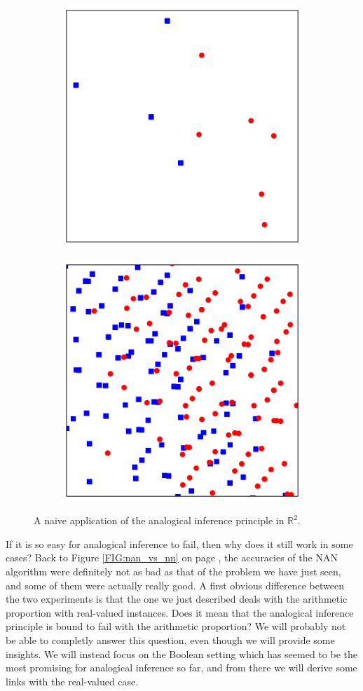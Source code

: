 \begin{figure}
\centering
\begin{subfigure}{.5\textwidth}
  \centering
  \includegraphics[width=.6\linewidth]{figures/AE_in_R2_S.pdf}
  \label{fig:sub1}
\end{subfigure}%
\begin{subfigure}{.5\textwidth}
  \centering
  \includegraphics[width=.6\linewidth]{figures/AE_in_R2_AE.pdf}
  \label{fig:sub2}
\end{subfigure}
  \caption{A naive application of the analogical inference principle in
  $\mathbb{R}^2$.}
\label{FIG:classif_in_R2}
\end{figure}

If it is so easy for analogical inference to fail, then why does it still work
in some cases? Back to Figure \ref{FIG:nan_vs_nn} on page
\pageref{FIG:nan_vs_nn}, the accuracies of the NAN algorithm were definitely
not as bad as that of the problem we have just seen, and some of them were
actually really good. A first obvious difference between the two experiments is
that the one we just described deals with the arithmetic proportion with
real-valued instances. Does it mean that the analogical inference principle is
bound to fail with the arithmetic proportion? We will probably not be able to
completly answer this question, even though we will provide some insights.  We
will instead focus on the Boolean setting which has seemed to be the most
promising for analogical inference so far, and from there we will derive some
links with the real-valued case.

